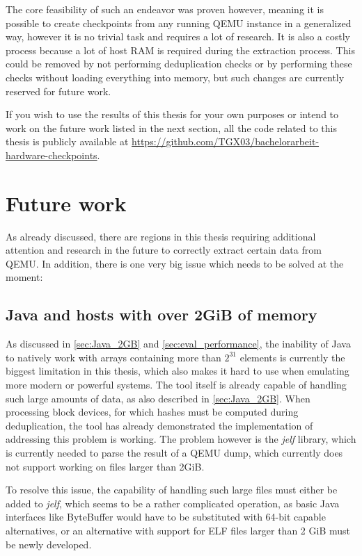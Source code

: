 The core feasibility of such an endeavor was proven however,
meaning it is possible to create checkpoints from any running QEMU instance in a generalized way,
however it is no trivial task and requires a lot of research.
It is also a costly process because a lot of host RAM is required during the extraction process.
This could be removed by not performing deduplication checks
or by performing these checks without loading everything into memory,
but such changes are currently reserved for future work.

If you wish to use the results of this thesis for your own purposes
or intend to work on the future work listed in the next section,
all the code related to this thesis is publicly available at \url{https://github.com/TGX03/bachelorarbeit-hardware-checkpoints}.

\section{Future work}
As already discussed, there are regions in this thesis requiring additional attention and research in the future to correctly extract certain data from QEMU.
In addition, there is one very big issue which needs to be solved at the moment:

\subsection{Java and hosts with over 2GiB of memory}
As discussed in \autoref{sec:Java_2GB} and \autoref{sec:eval_performance},
the inability of Java to natively work with arrays containing more than $2^{31}$ elements
is currently the biggest limitation in this thesis,
which also makes it hard to use when emulating more modern or powerful systems.
The tool itself is already capable of handling such large amounts of data, as also described in \autoref{sec:Java_2GB}.
When processing block devices, for which hashes must be computed during deduplication,
the tool has already demonstrated the implementation of addressing this problem is working.
The problem however is the \emph{jelf} library, which is currently needed to parse the result of a QEMU dump,
which currently does not support working on files larger than 2GiB.

To resolve this issue, the capability of handling such large files must either be added to \emph{jelf},
which seems to be a rather complicated operation,
as basic Java interfaces like ByteBuffer would have to be substituted with 64-bit capable alternatives,
or an alternative with support for ELF files larger than 2 GiB must be newly developed.

